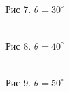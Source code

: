 \documentclass[12pt]{article}
\begin{document}
  \begin{figure}[h!]
    \begin{minipage}[h]{0.32\linewidth}
      \\
      Рис 7. $\theta = 30^{\circ}$
    \end{minipage}
    \begin{minipage}[h]{0.32\linewidth}
      \\
      Рис 8. $\theta = 40^{\circ}$
    \end{minipage}
    \begin{minipage}[h]{0.32\linewidth}
      \\
      Рис 9. $\theta = 50^{\circ}$
    \end{minipage}
  \end{figure}
\end{document}
